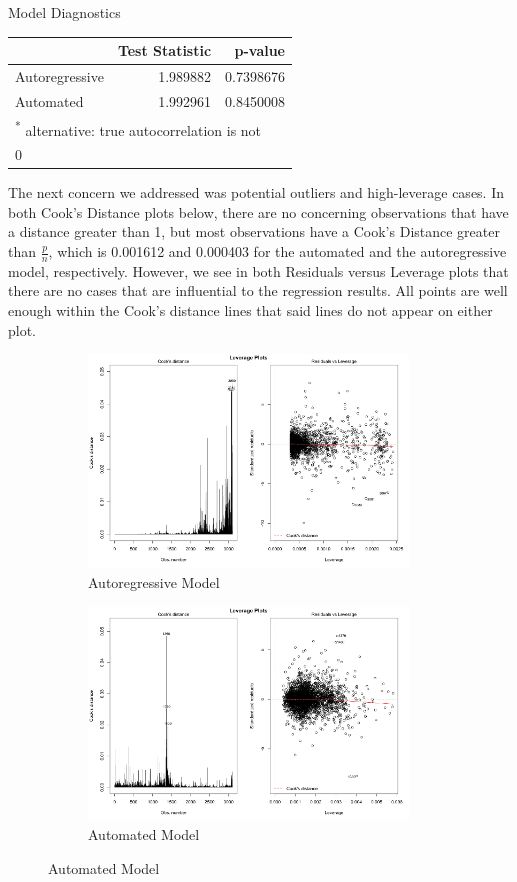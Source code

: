 \documentclass[]{article}
\begin{document}
\begin{section}{Model Diagnostics}
\begin{table}[H]
\centering
\begin{tabular}{l|r|r}
\hline
  & Test Statistic & p-value\\
\hline
Autoregressive & 1.989882 & 0.7398676\\
\hline
Automated & 1.992961 & 0.8450008\\
\hline
\multicolumn{3}{l}{\textsuperscript{*} alternative: true autocorrelation is not}\\
\multicolumn{3}{l}{0}\\
\end{tabular}
\end{table}

The next concern we addressed was potential outliers and high-leverage cases. In both Cook's Distance plots below, there are no concerning observations that have a distance greater than 1, but most observations have a Cook's Distance greater than $\frac{p}{n}$, which is 0.001612 and 0.000403 for the automated and the autoregressive model, respectively. However, we see in both Residuals versus Leverage plots that there are no cases that are influential to the regression results. All points are well enough within the Cook's distance lines that said lines do not appear on either plot.

\begin{figure}[h]
\begin{subfigure}{.5\textwidth}
  \includegraphics[width=85mm]{diagnostics/arm_leverage_plots.png}
  \caption{Autoregressive Model}
\end{subfigure}%
\begin{subfigure}{.5\textwidth}
  \includegraphics[width=85mm]{diagnostics/fm_leverage_plots.png}
  \caption{Automated Model}
\end{subfigure}
\end{figure}




\end{section}
\end{document}
